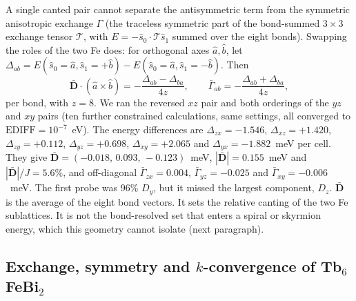 \documentclass[aps,prb,preprint,superscriptaddress,longbibliography,nofootinbib]{revtex4-2}
\begin{document}
A single canted pair cannot separate the antisymmetric term from the symmetric anisotropic exchange
$\Gamma$ (the traceless symmetric part of the bond-summed $3\times3$ exchange tensor $\mathcal{T}$, with
$E=-\hat{s}_0\cdot\mathcal{T}\hat{s}_1$ summed over the eight bonds). Swapping the roles of the two Fe does:
for orthogonal axes $\hat{a},\hat{b}$, let $\Delta_{ab}=E(\hat{s}_0{=}\hat{a},\hat{s}_1{=}{+}\hat{b})-
E(\hat{s}_0{=}\hat{a},\hat{s}_1{=}{-}\hat{b})$. Then
\begin{equation}
\bar{\mathbf{D}}\cdot(\hat{a}\times\hat{b}) = -\frac{\Delta_{ab}-\Delta_{ba}}{4z},\qquad
\bar{\Gamma}_{ab} = -\frac{\Delta_{ab}+\Delta_{ba}}{4z},
\end{equation}
per bond, with $z=8$. We ran the reversed $xz$ pair and both orderings of the $yz$ and $xy$ pairs (ten further
constrained calculations, same settings, all converged to $\mathrm{EDIFF}=10^{-7}$~eV). The energy differences are
$\Delta_{zx}=-1.546$, $\Delta_{xz}=+1.420$, $\Delta_{zy}=+0.112$, $\Delta_{yz}=+0.698$, $\Delta_{xy}=+2.065$ and
$\Delta_{yx}=-1.882$~meV per cell. They give $\bar{\mathbf{D}}=(-0.018,\,0.093,\,-0.123)$~meV,
$|\bar{\mathbf{D}}|=0.155$~meV and $|\bar{\mathbf{D}}|/J=5.6\%$, and off-diagonal
$\bar{\Gamma}_{zx}=0.004$, $\bar{\Gamma}_{yz}=-0.025$ and $\bar{\Gamma}_{xy}=-0.006$~meV. The first probe was
96\% $D_y$, but it missed the largest component, $D_z$. $\bar{\mathbf{D}}$ is the average of the eight
bond vectors. It sets the relative canting of the two Fe sublattices. It is not the bond-resolved set that
enters a spiral or skyrmion energy, which this geometry cannot isolate (next paragraph).

\subsection*{Exchange, symmetry and $k$-convergence of Tb$_6$FeBi$_2$}
\end{document}
